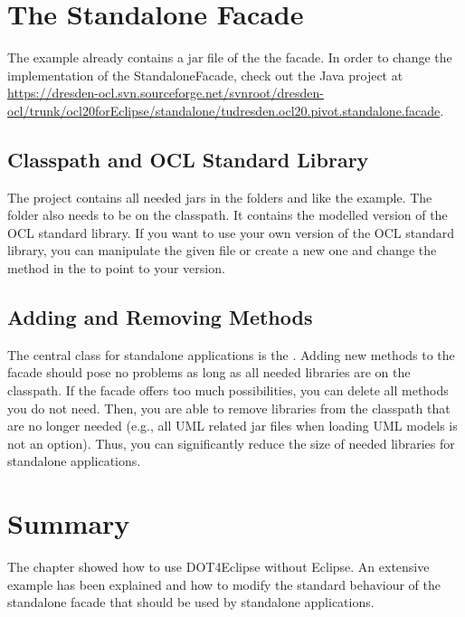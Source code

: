\section{The Standalone Facade}

The example already contains a jar file of the the facade. In order to change the implementation of the StandaloneFacade, check out the Java project at \url{https://dresden-ocl.svn.sourceforge.net/svnroot/dresden-ocl/trunk/ocl20forEclipse/standalone/tudresden.ocl20.pivot.standalone.facade}.

\subsection{Classpath and OCL Standard Library}
The project contains all needed jars in the folders  and  like the example. The  folder also needs to be on the classpath. It contains the modelled version of the OCL standard library. If you want to use your own version of the OCL standard library, you can manipulate the given file or create a new one and change the  method in the  to point to your version.

\subsection{Adding and Removing Methods}
The central class for standalone applications is the . Adding new methods to the facade should pose no problems as long as all needed libraries are on the classpath. If the facade offers too much possibilities, you can delete all methods you do not need. Then, you are able to remove libraries from the classpath that are no longer needed (e.g., all UML related jar files when loading UML models is not an option). Thus, you can significantly reduce the size of needed libraries for standalone applications.


\section{Summary}

The chapter showed how to use \acl{DOT4Eclipse} without Eclipse. An extensive example has been explained and how to modify the standard behaviour of the standalone facade that should be used by standalone applications.